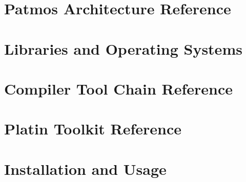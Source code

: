 \documentclass[11pt,twoside,a4paper]{report}
\begin{document}



\chapter{Patmos Architecture Reference}






\chapter{Libraries and Operating Systems}





\chapter{Compiler Tool Chain Reference}




\chapter{Platin Toolkit Reference}





\chapter{Installation and Usage}
\end{document}

